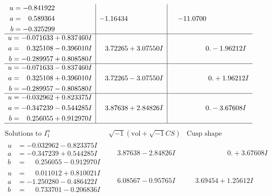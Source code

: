 \documentclass[1p]{elsarticle_modified}
\theoremstyle{definition}
\newcommand{\I}{\sqrt{-1}}
\begin{document}
$$\begin{array}{c|c|c}
\begin{aligned}
u &= -0.841922\phantom{ +0.000000I} \\
a &= \phantom{-}0.589364\phantom{ +0.000000I} \\
b &= -0.325299\phantom{ +0.000000I}\end{aligned}
 & -1.16434\phantom{ +0.000000I} & -11.0700\phantom{ +0.000000I} \\ \hline\begin{aligned}
u &= -0.071633 + 0.837460 I \\
a &= \phantom{-}0.325108 - 0.396010 I \\
b &= -0.289957 + 0.808580 I\end{aligned}
 & \phantom{-}3.72265 + 3.07550 I & \phantom{-0.000000 } 0. - 1.96212 I \\ \hline\begin{aligned}
u &= -0.071633 - 0.837460 I \\
a &= \phantom{-}0.325108 + 0.396010 I \\
b &= -0.289957 - 0.808580 I\end{aligned}
 & \phantom{-}3.72265 - 3.07550 I & \phantom{-0.000000 -}0. + 1.96212 I \\ \hline\begin{aligned}
u &= -0.032962 + 0.823375 I \\
a &= -0.347239 - 0.544285 I \\
b &= \phantom{-}0.256055 + 0.912970 I\end{aligned}
 & \phantom{-}3.87638 + 2.84826 I & \phantom{-0.000000 } 0. - 3.67608 I\\
 \hline 
 \end{array}$$\newpage$$\begin{array}{c|c|c}  
\text{Solutions to }I^u_{1}& \I (\text{vol} + \sqrt{-1}CS) & \text{Cusp shape}\\
 \hline 
\begin{aligned}
u &= -0.032962 - 0.823375 I \\
a &= -0.347239 + 0.544285 I \\
b &= \phantom{-}0.256055 - 0.912970 I\end{aligned}
 & \phantom{-}3.87638 - 2.84826 I & \phantom{-0.000000 -}0. + 3.67608 I \\ \hline\begin{aligned}
u &= \phantom{-}0.011012 + 0.810021 I \\
a &= -1.250280 - 0.486422 I \\
b &= \phantom{-}0.733701 - 0.206836 I\end{aligned}
 & \phantom{-}6.08567 - 0.95765 I & \phantom{-}3.69454 + 1.25612 I \\ \hline\begin{aligned}

\end{aligned}
\end{array}$$
\end{document}
